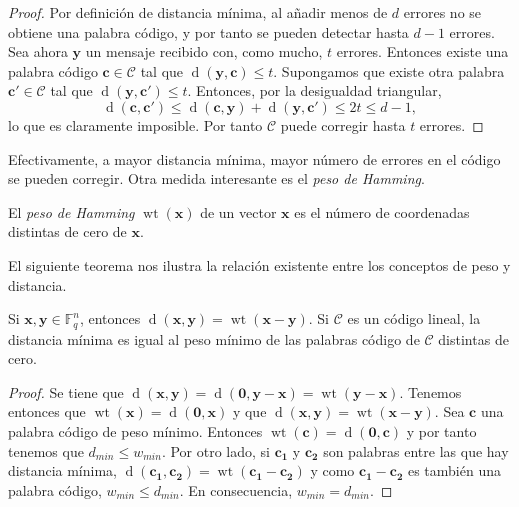 \begin{proof}
  Por definición de distancia mínima, al añadir menos de \(d\) errores no se obtiene una palabra código, y por tanto se pueden detectar hasta \(d - 1\) errores.
  Sea ahora \(\mathbf{y}\) un mensaje recibido con, como mucho, \(t\) errores.
  Entonces existe una palabra código \(\mathbf{c} \in \mathcal C\) tal que \(\operatorname{d}(\mathbf{y}, \mathbf{c}) \leq t\).
  Supongamos que existe otra palabra \(\mathbf{c}' \in \mathcal C\) tal que \(\operatorname{d}(\mathbf{y}, \mathbf{c}') \leq t\).
  Entonces, por la desigualdad triangular,
  \[
    \operatorname{d}(\mathbf{c}, \mathbf{c}') \leq \operatorname{d}(\mathbf{c}, \mathbf{y}) + \operatorname{d}(\mathbf{y}, \mathbf{c}') \leq 2t \leq d - 1,
  \]
  lo que es claramente imposible.
  Por tanto \(\mathcal C\) puede corregir hasta \(t\) errores.
\end{proof}

Efectivamente, a mayor distancia mínima, mayor número de errores en el código se pueden corregir.
Otra medida interesante es el \textit{peso de Hamming}.

\begin{definition}
  El \textit{peso de Hamming} \(\operatorname{wt}(\mathbf{x})\) de un vector \(\mathbf{x}\) es el número de coordenadas distintas de cero de \(\mathbf{x}\).
\end{definition}

El siguiente teorema nos ilustra la relación existente entre los conceptos de peso y distancia.

\begin{theorem}
  Si \(\mathbf{x}, \mathbf{y} \in \mathbb F_q^n\), entonces \(\operatorname{d}(\mathbf{x}, \mathbf{y}) = \operatorname{wt}(\mathbf{x} - \mathbf{y})\).
  Si \(\mathcal C\) es un código lineal, la distancia mínima es igual al peso mínimo de las palabras código de \(\mathcal C\) distintas de cero.
\end{theorem}

\begin{proof}
  Se tiene que \(\operatorname{d}(\mathbf{x}, \mathbf{y}) = \operatorname{d}(\mathbf{0}, \mathbf{y} - \mathbf{x}) = \operatorname{wt}(\mathbf{y} - \mathbf{x})\).
  Tenemos entonces que \(\operatorname{wt}(\mathbf{x}) = \operatorname{d}(\mathbf{0}, \mathbf{x})\) y que \(\operatorname{d}(\mathbf{x}, \mathbf{y}) = \operatorname{wt}(\mathbf{x} - \mathbf{y})\).
  Sea \(\mathbf{c}\) una palabra código de peso mínimo.
  Entonces \(\operatorname{wt}(\mathbf{c}) = \operatorname{d}(\mathbf{0}, \mathbf{c})\) y por tanto tenemos que \(d_{min} \leq w_{min}\).
  Por otro lado, si \(\mathbf{c_1}\) y \(\mathbf{c_2}\) son palabras entre las que hay distancia mínima, \(\operatorname{d}(\mathbf{c_1}, \mathbf{c_2}) = \operatorname{wt}(\mathbf{c_1} - \mathbf{c_2})\) y como \(\mathbf{c_1} - \mathbf{c_2}\) es también una palabra código, \(w_{min} \leq d_{min}\).
  En consecuencia, \(w_{min} = d_{min}\).
\end{proof}

